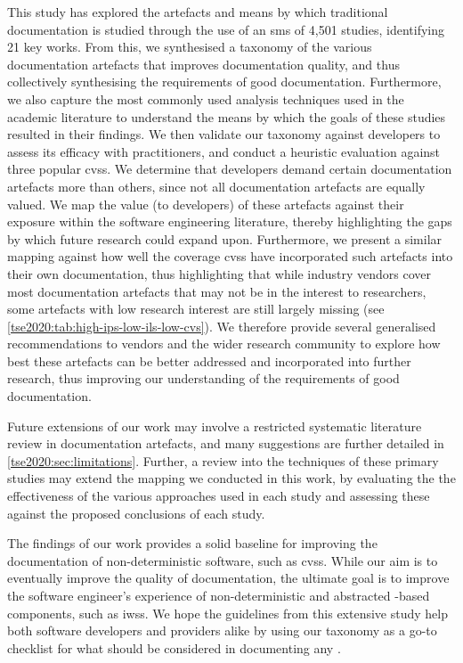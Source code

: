 This study has explored the artefacts and means by which traditional  documentation is studied through the use of an \gls{sms} of 4,501 studies, identifying 21 key works. From this, we synthesised a taxonomy of the various documentation artefacts that improves  documentation quality, and thus collectively synthesising the requirements of good  documentation. Furthermore, we also capture the most commonly used analysis techniques used in the academic literature to understand the means by which the goals of these studies resulted in their findings. We then validate our taxonomy against developers to assess its efficacy with practitioners, and conduct a heuristic evaluation against three popular \glspl{cvs}. We determine that developers demand certain documentation artefacts more than others, since not all documentation artefacts are equally valued. We map the value (to developers) of these artefacts against their exposure within the software engineering literature, thereby highlighting the gaps by which future research could expand upon. Furthermore, we present a similar mapping against how well the coverage \glspl{cvs} have incorporated such artefacts into their own  documentation, thus highlighting that while industry vendors cover most documentation artefacts that may not be in the interest to researchers, some artefacts with low research interest are still largely missing (see \cref{tse2020:tab:high-ips-low-ils-low-cvs}). We therefore provide several generalised recommendations to vendors and the wider research community to explore how best these artefacts can be better addressed and incorporated into further research, thus improving our understanding of the requirements of good  documentation.

Future extensions of our work may involve a restricted systematic literature review in  documentation artefacts, and many suggestions are further detailed in \cref{tse2020:sec:limitations}. Further, a review into the techniques of these primary studies may extend the mapping we conducted in this work, by evaluating the the effectiveness of the various approaches used in each study and assessing these against the proposed conclusions of each study.

The findings of our work provides a solid baseline for improving the documentation of non-deterministic software, such as \glspl{cvs}. While our aim is to eventually improve the quality of  documentation, the ultimate goal is to improve the software engineer's experience of non-deterministic and abstracted -based components, such as \glspl{iws}. We hope the guidelines from this extensive study help both software developers and  providers alike by using our taxonomy as a go-to checklist for what should be considered in documenting any .
